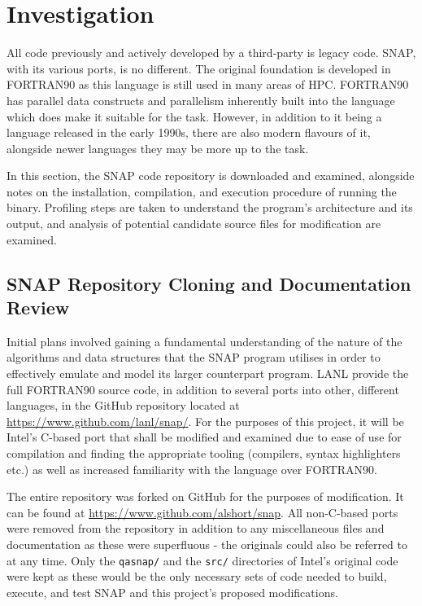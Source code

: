 \documentclass[conference]{IEEEtran}
\begin{document}

\section{Investigation}
\label{sec:investigation}

All code previously and actively developed by a third-party is legacy code. SNAP, with its various ports, is no different. The original foundation is developed in FORTRAN90 as this language is still used in many areas of HPC. FORTRAN90 has parallel data constructs and parallelism inherently built into the language which does make it suitable for the task. However, in addition to it being a language released in the early 1990s, there are also modern flavours of it, alongside newer languages they may be more up to the task.

In this section, the SNAP code repository is downloaded and examined, alongside notes on the installation, compilation, and execution procedure of running the binary. Profiling steps are taken to understand the program's architecture and its output, and analysis of potential candidate source files for modification are examined.

\subsection{SNAP Repository Cloning and Documentation Review}

Initial plans involved gaining a fundamental understanding of the nature of the algorithms and data structures that the SNAP program utilises in order to effectively emulate and model its larger counterpart program. LANL provide the full FORTRAN90 source code, in addition to several ports into other, different languages, in the GitHub repository located at \url{https://www.github.com/lanl/snap/}. For the purposes of this project, it will be Intel's C-based port that shall be modified and examined due to ease of use for compilation and finding the appropriate tooling (compilers, syntax highlighters etc.) as well as increased familiarity with the language over FORTRAN90.

The entire repository was forked on GitHub for the purposes of modification. It can be found at \url{https://www.github.com/alshort/snap}. All non-C-based ports were removed from the repository in addition to any miscellaneous files and documentation as these were superfluous - the originals could also be referred to at any time. Only the \texttt{qasnap/} and the \texttt{src/} directories of Intel's original code were kept as these would be the only necessary sets of code needed to build, execute, and test SNAP and this project's proposed modifications.
\end{document}
